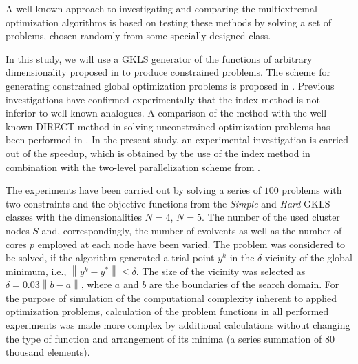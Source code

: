 \documentclass[smallextended]{svjour3}       %
\begin{document}
A well-known approach to investigating and comparing the multiextremal optimization algorithms is based on testing these methods by solving a set of problems, chosen randomly from some specially designed class.


In this study, we will use a GKLS generator of the functions of arbitrary dimensionality proposed in \cite{Gaviano2003} to produce constrained problems. The scheme for generating constrained global optimization problems is proposed in \cite{Gergel2017}. Previous investigations have confirmed experimentally that the index method is not inferior to well-known analogues. A comparison of the method with the well known DIRECT method \cite{Jones2001} in solving unconstrained optimization problems has been performed in \cite{Barkalov2015}. In the present study, an experimental investigation is carried out of the speedup, which is obtained by the use of the index method in combination with the two-level parallelization scheme from \cite{Sidorov2015}.

The experiments have been carried out by solving a series of $100$ problems with two constraints and the objective functions from the \textit{Simple} and \textit{Hard} GKLS classes with the dimensionalities $N=4$, $N=5$. The number of the used cluster nodes $S$ and, correspondingly, the number of evolvents as well as the number of cores $p$ employed at each node have been varied. The problem was considered to be solved, if the algorithm generated a trial point $y^k$ in the $\delta$-vicinity of the global minimum, i.e., $\left\|y^k-y^*\right\|\leq \delta$. The size of the vicinity was selected as $\delta=0.03\left\|b-a\right\|$, where $a$ and $b$ are the boundaries of the search domain. For the purpose of simulation of the computational complexity inherent to applied optimization problems, calculation of the problem functions in all performed experiments was made more complex by additional calculations without changing the type of function and arrangement of its minima (a series summation of $80$ thousand elements).
\end{document}
